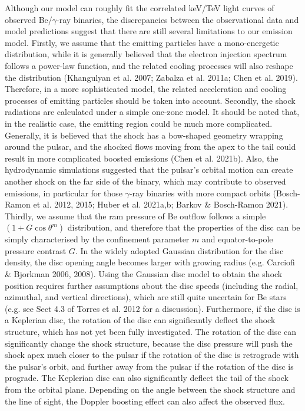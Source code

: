 \documentclass{aa}
\begin{document}
Although our model can roughly fit the correlated keV/TeV light curves of observed Be/$\gamma$-ray binaries, the discrepancies between the observational data and model predictions suggest that there are still several limitations to our emission model.
Firstly, we assume that the emitting particles have a mono-energetic distribution, while it is generally believed that the electron injection spectrum follows a power-law function, and the related cooling processes will also reshape the distribution (Khangulyan et al. 2007; Zabalza et al. 2011a; Chen et al. 2019). Therefore, in a more sophisticated model,
the related acceleration and cooling processes of emitting particles should be taken into account.
Secondly, the shock radiations are calculated under a simple one-zone model. It should be noted that, in the realistic case, the emitting region could be much more complicated.
Generally, it is believed that the shock has a bow-shaped geometry wrapping around the pulsar, and the shocked flows moving from the apex to the tail could result in more complicated boosted emissions (Chen et al. 2021b). Also, the hydrodynamic simulations suggested that the pulsar's orbital motion can create another shock on the far side of the binary, which may contribute to observed emissions, in particular for those $\gamma$-ray binaries with more compact orbits (Bosch-Ramon et al. 2012, 2015; Huber et al. 2021a,b; Barkov \& Bosch-Ramon 2021).
Thirdly, we assume that the ram pressure of Be outflow follows a simple $(1+G\cos\theta^m)$ distribution, and therefore that the properties of the disc can be simply characterised by the confinement parameter $m$ and equator-to-pole pressure contrast $G$.
In the widely adopted Gaussian distribution for the disc density, the disc opening angle becomes larger with growing radius (e.g. Carciofi \& Bjorkman 2006, 2008). Using the Gaussian disc model to obtain the shock position requires further assumptions about the disc speeds (including the radial, azimuthal, and vertical directions), which are still quite uncertain for Be stars (e.g. see Sect 4.3 of Torres et al. 2012 for a discussion). Furthermore, if the disc is a Keplerian disc, the rotation of the disc can significantly deflect the shock structure, which has not yet been fully investigated.
The rotation of the disc can significantly change the shock structure, because the disc pressure will push the shock apex much closer to the pulsar if the rotation of the disc is retrograde with the pulsar's orbit, and further away from the pulsar if the
rotation of the disc is prograde. The Keplerian disc can also significantly deflect the tail of the shock from the orbital plane. Depending on the angle between the shock structure and the line of sight, the Doppler boosting effect can also affect the observed flux.
\end{document}
